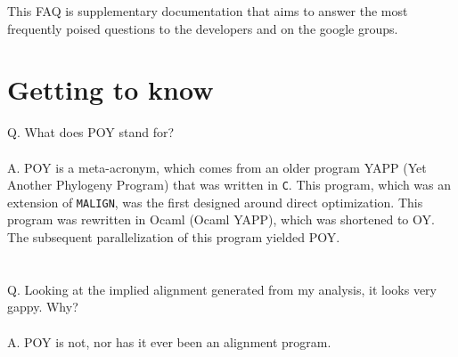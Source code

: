 This FAQ is supplementary documentation that aims to answer the most frequently poised questions to 
the \poy developers and on the \poy google groups.

\section{Getting to know \poy}
Q. What does POY  stand for?\\
\\
A. POY is a meta-acronym, which comes from an older program YAPP (Yet Another Phylogeny Program) that 
was written in \texttt{C}.  This program, which was an extension of \texttt{MALIGN}, was the first designed around direct 
optimization.  This program was rewritten in Ocaml (Ocaml YAPP), which was shortened to OY.  
The subsequent parallelization of this program yielded POY.\\
\\
\\
Q. Looking at the implied alignment generated from my \poy analysis, it looks very gappy.  Why?\\
\\
A. POY is not, nor has it ever been an alignment program.\\
\\
\\
